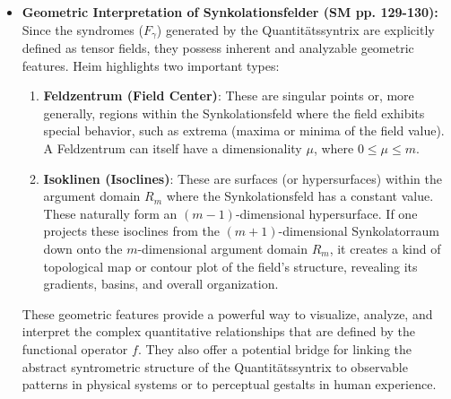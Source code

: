 \documentclass[12pt]{article}
\newcommand{\syndrom}{F}
\begin{document}
\begin{itemize}
    \item \textbf{Geometric Interpretation of Synkolationsfelder (SM pp. 129-130):}
    Since the syndromes (\(\syndrom_\gamma\)) generated by the Quantitätssyntrix are explicitly defined as tensor fields, they possess inherent and analyzable geometric features. Heim highlights two important types:
    \begin{enumerate}
        \item \textbf{Feldzentrum (Field Center)}: These are singular points or, more generally, regions within the Synkolationsfeld where the field exhibits special behavior, such as extrema (maxima or minima of the field value). A Feldzentrum can itself have a dimensionality \( \mu \), where \( 0 \leq \mu \leq m \).
        \item \textbf{Isoklinen (Isoclines)}: These are surfaces (or hypersurfaces) within the argument domain \( R_m \) where the Synkolationsfeld has a constant value. These naturally form an \((m-1)\)-dimensional hypersurface. If one projects these isoclines from the \( (m+1) \)-dimensional Synkolatorraum down onto the \( m \)-dimensional argument domain \( R_m \), it creates a kind of topological map or contour plot of the field's structure, revealing its gradients, basins, and overall organization.
    \end{enumerate}
    These geometric features provide a powerful way to visualize, analyze, and interpret the complex quantitative relationships that are defined by the functional operator \( f \). They also offer a potential bridge for linking the abstract syntrometric structure of the Quantitätssyntrix to observable patterns in physical systems or to perceptual gestalts in human experience.


\end{itemize}
\end{document}
